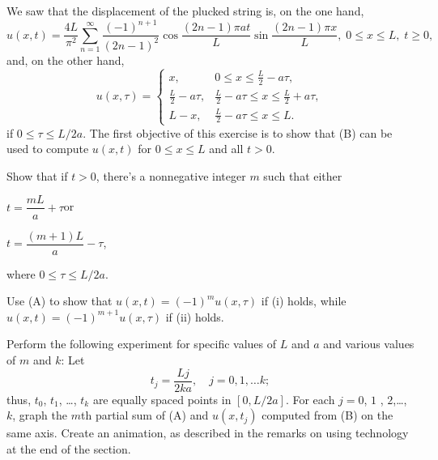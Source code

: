 \begin{exerciselist}
\item\label{exer:12.2.16}We saw
that the displacement of the plucked string is,
on the one hand,
\[
u(x,t)=\frac{4L}{\pi^2}\sum_{n=1}^\infty\frac{(-1)^{n+1}}{(2n-1)^2}
\cos\frac{(2n-1)\pi at}{L}\sin\frac{(2n-1)\pi x}{L},\; 0\le x\le
L,\; t\ge 0,
\tag{A}
\]
and, on the other hand,
\[
u(x,\tau)=
\begin{cases}
x,&0\le x\le\frac{L}{2}-a\tau,\\
\frac{L}{2}-a\tau,&\frac{L}{2}-a\tau\le x\le\frac{L}{2}+a\tau,\\
L-x,&\frac{L}{2}-a\tau\le x\le L.
\end{cases}
\tag{B}
\]
if $0\le \tau\le L/2a$.
The first objective  of this exercise is to show that (B) can be used
to compute $u(x,t)$ for  $0\le x\le L$ and all $t>0$.
\begin{alist}
\item %
Show that if $t>0$,  there's a nonnegative integer
$m$ such that either
\begin{rmlist}[columns=2,list-offset=5em]
\item $t=\dfrac{mL}{a}+\tau$\qquad\qquad or
\item $t=\dfrac{(m+1)L}{a}-\tau$,
\end{rmlist}
where $0\le \tau\le L/2a$.
\item %
Use (A) to show that $u(x,t)=(-1)^mu(x,\tau)$ if (i)
holds, while $u(x,t)=(-1)^{m+1}u(x,\tau)$ if (ii) holds.
\item %
\Lex\;  Perform the following experiment for specific values
of $L$ and $a$ and various values of $m$ and $k$:
 Let
\[
t_j=\frac{Lj}{2ka},\quad j=0,1,\dots k;
\]
thus, $t_0$, $t_1$, \dots, $t_k$ are equally spaced points in $[0,L/2a]$.
For each $j=0$, $1$ , $2$,\dots, $k$, graph the $m$th partial sum
of (A) and $u(x,t_j)$ computed from (B) on the same axis.
Create an animation, as described in the remarks on using
technology at the end of the section.
\end{alist}


\end{exerciselist}
